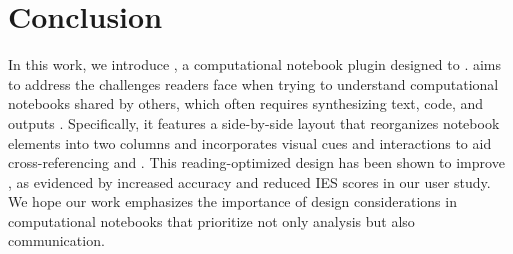 \section{Conclusion}


In this work, we introduce \tool, a computational notebook plugin designed to . 
\tool aims to address the challenges readers face when trying to  understand computational notebooks shared by others, which often requires synthesizing text, code, and outputs . 
Specifically, it features a side-by-side layout that reorganizes notebook elements into two columns and incorporates visual cues and interactions to aid cross-referencing and .
This reading-optimized design has been shown to improve , as evidenced by increased accuracy and reduced IES scores in our user study.
We hope our work emphasizes the importance of design considerations in computational notebooks that prioritize not only analysis but also communication. 
